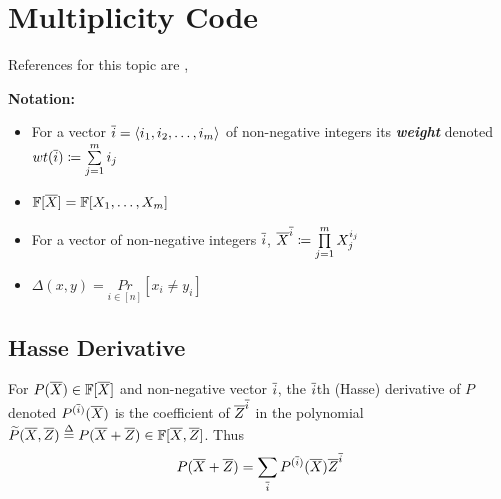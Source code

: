 \chapter{Multiplicity Code}
References for this topic are \cite{highratesublin}, \cite{kopparty2015remarks}
\parinf

\textbf{Notation:}  \begin{itemize}
	\item For a vector $\overline{i}=\langle i_1,i_2,\dots, i_m\rangle$ of non-negative integers its \textbf{\textit{weight}} denoted $wt(\overline{i})\coloneqq \sum\limits_{j=1}^m i_j$
	\item $\mathbb{F}[\overline{X}]=\mathbb{F}[X_1,\dots, X_m]$
	\item For a vector of non-negative integers $\overline{i}$, $\overline{X}^{\overline{i}}\coloneqq \prod\limits_{j=1}^mX_j^{i_j}$
	\item $\Delta(x,y)=\underset{i\in [n]}{Pr}[x_i\neq y_i]$
\end{itemize}\parinn 
\section{Hasse Derivative}
\begin{definition}
	For $P(\overline{X})\in \mathbb{F}[\overline{X}]$ and non-negative vector $\overline{i}$, the $\overline{i}$th (Hasse) derivative of $P$ denoted $P^{(\overline{i})}(\overline{X})$ is the coefficient of $\overline{Z}^{\overline{i}}$ in the polynomial $\widetilde{P} (\overline{X},\overline{Z})\overset{\Delta}{=} P(\overline{X}+\overline{Z}) \in \mathbb{F}[\overline{X},\overline{Z}]$. Thus $$P(\overline{X}+\overline{Z})= \sum_{\overline{i}} P^{(\overline{i})}(\overline{X})\overline{Z}^{ \overline{i}}$$
\end{definition}
